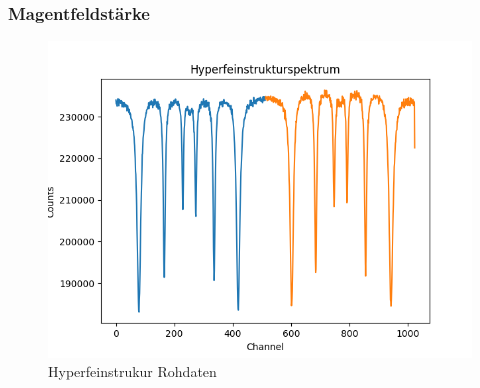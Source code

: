 \documentclass[12pt,a4paper]{article}
\begin{document}
\subsubsection{Magentfeldstärke}

\begin{figure}
\centering
\includegraphics[scale=0.8]{Bilder/Hyperfein/Hyper_Roh.png}
\caption{Hyperfeinstrukur Rohdaten}
\label{fig:Hyper_Roh}
\end{figure}
\end{document}
